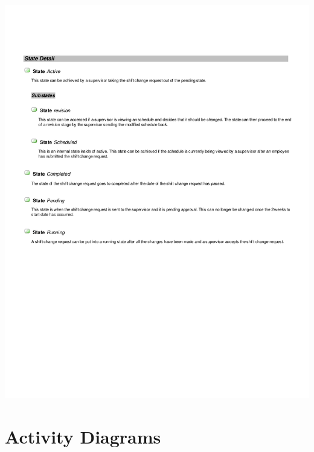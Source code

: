 \documentclass[letterpaper,12pt]{report}
\begin{document}
\includegraphics[scale=0.9,trim=15mm 30mm 25mm 20mm]{diagrams/reqtimeoff2.pdf}
\newpage
\clearpage
\chapter{Activity Diagrams}
\newpage
\end{document}
